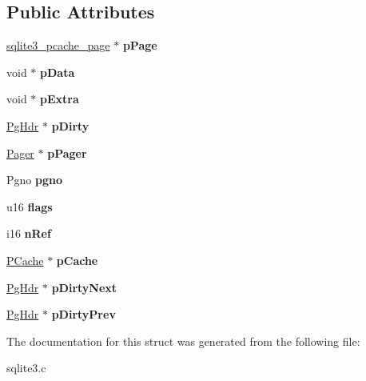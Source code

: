 \subsection*{Public Attributes}
\begin{DoxyCompactItemize}
\item 
\hyperlink{structsqlite3__pcache__page}{sqlite3\+\_\+pcache\+\_\+page} $\ast$ {\bfseries p\+Page}\hypertarget{structPgHdr_aa5645976ba0634993a7304dce8856c8b}{}\label{structPgHdr_aa5645976ba0634993a7304dce8856c8b}

\item 
void $\ast$ {\bfseries p\+Data}\hypertarget{structPgHdr_a0f9f2ac8492c0cdad5898036db20b798}{}\label{structPgHdr_a0f9f2ac8492c0cdad5898036db20b798}

\item 
void $\ast$ {\bfseries p\+Extra}\hypertarget{structPgHdr_a8ff7430ed04077f1ae20d10801968164}{}\label{structPgHdr_a8ff7430ed04077f1ae20d10801968164}

\item 
\hyperlink{structPgHdr}{Pg\+Hdr} $\ast$ {\bfseries p\+Dirty}\hypertarget{structPgHdr_a7732b1c0f19d9555ac93d4879fc95bbd}{}\label{structPgHdr_a7732b1c0f19d9555ac93d4879fc95bbd}

\item 
\hyperlink{structPager}{Pager} $\ast$ {\bfseries p\+Pager}\hypertarget{structPgHdr_aaa4879a9510c8a819a1e10a8ee21495b}{}\label{structPgHdr_aaa4879a9510c8a819a1e10a8ee21495b}

\item 
Pgno {\bfseries pgno}\hypertarget{structPgHdr_ab6e2223e410acf9bae7f12f1b1293589}{}\label{structPgHdr_ab6e2223e410acf9bae7f12f1b1293589}

\item 
u16 {\bfseries flags}\hypertarget{structPgHdr_a8ef58380f7e04f1e3c76fa208e227f95}{}\label{structPgHdr_a8ef58380f7e04f1e3c76fa208e227f95}

\item 
i16 {\bfseries n\+Ref}\hypertarget{structPgHdr_ac68c685d117788c18849e8853dd419d5}{}\label{structPgHdr_ac68c685d117788c18849e8853dd419d5}

\item 
\hyperlink{structPCache}{P\+Cache} $\ast$ {\bfseries p\+Cache}\hypertarget{structPgHdr_a557aeaddd1b0805815ce06f1bfd27782}{}\label{structPgHdr_a557aeaddd1b0805815ce06f1bfd27782}

\item 
\hyperlink{structPgHdr}{Pg\+Hdr} $\ast$ {\bfseries p\+Dirty\+Next}\hypertarget{structPgHdr_a61b56eb694ce445799963f7eb912e367}{}\label{structPgHdr_a61b56eb694ce445799963f7eb912e367}

\item 
\hyperlink{structPgHdr}{Pg\+Hdr} $\ast$ {\bfseries p\+Dirty\+Prev}\hypertarget{structPgHdr_a8392b45bb05d88c734020beb912304dc}{}\label{structPgHdr_a8392b45bb05d88c734020beb912304dc}

\end{DoxyCompactItemize}


The documentation for this struct was generated from the following file\+:\begin{DoxyCompactItemize}
\item 
sqlite3.\+c\end{DoxyCompactItemize}

